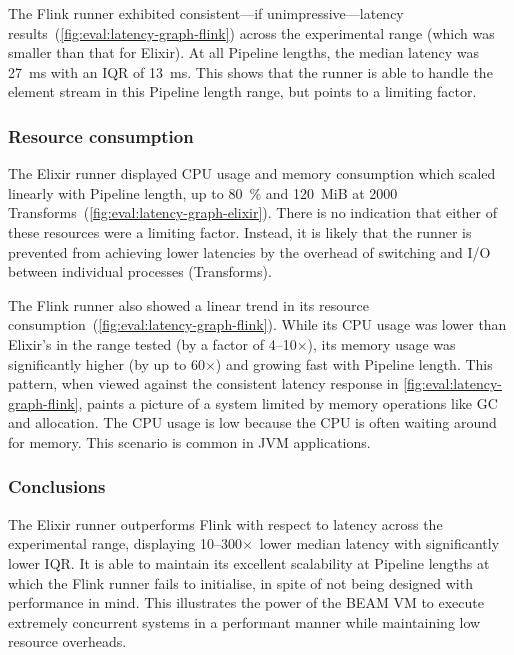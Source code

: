 The Flink runner exhibited consistent---if unimpressive---latency results~(\cref{fig:eval:latency-graph-flink}) across the experimental range (which was smaller than that for Elixir).
At all Pipeline lengths, the median latency was \SI{27}{\milli\second} with an IQR of \SI{13}{\milli\second}.
This shows that the runner is able to handle the element stream in this Pipeline length range, but points to a limiting factor.

\subsubsection{Resource consumption}

The Elixir runner displayed CPU usage and memory consumption which scaled linearly with Pipeline length, up to \SI{80}{\percent} and \SI{120}{MiB} at \num{2000} Transforms~(\cref{fig:eval:latency-graph-elixir}).
There is no indication that either of these resources were a limiting factor.
Instead, it is likely that the runner is prevented from achieving lower latencies by the overhead of switching and I/O between individual processes (Transforms).

The Flink runner also showed a linear trend in its resource consumption~(\cref{fig:eval:latency-graph-flink}).
While its CPU usage was lower than Elixir's in the range tested (by a factor of \num{4}--\num{10}$\times$), its memory usage was significantly higher (by up to \num{60}$\times$) and growing fast with Pipeline length.
This pattern, when viewed against the consistent latency response in \cref{fig:eval:latency-graph-flink}, paints a picture of a system limited by memory operations like GC and allocation.
The CPU usage is low because the CPU is often waiting around for memory.
This scenario is common in JVM applications.

\subsubsection{Conclusions}

The Elixir runner outperforms Flink with respect to latency across the experimental range, displaying \num{10}--\num{300}$\times$~lower median latency with significantly lower IQR.
It is able to maintain its excellent scalability at Pipeline lengths at which the Flink runner fails to initialise, in spite of not being designed with performance in mind.
This illustrates the power of the BEAM VM to execute extremely concurrent systems in a performant manner while maintaining low resource overheads.

